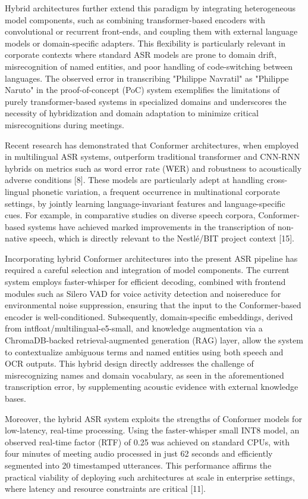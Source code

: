 \documentclass[12pt,a4paper]{article}
\begin{document}
Hybrid architectures further extend this paradigm by integrating heterogeneous model components, such as combining transformer-based encoders with convolutional or recurrent front-ends, and coupling them with external language models or domain-specific adapters. This flexibility is particularly relevant in corporate contexts where standard ASR models are prone to domain drift, misrecognition of named entities, and poor handling of code-switching between languages. The observed error in transcribing "Philippe Navratil" as "Philippe Naruto" in the proof-of-concept (PoC) system exemplifies the limitations of purely transformer-based systems in specialized domains and underscores the necessity of hybridization and domain adaptation to minimize critical misrecognitions during meetings.


Recent research has demonstrated that Conformer architectures, when employed in multilingual ASR systems, outperform traditional transformer and CNN-RNN hybrids on metrics such as word error rate (WER) and robustness to acoustically adverse conditions [8]. These models are particularly adept at handling cross-lingual phonetic variation, a frequent occurrence in multinational corporate settings, by jointly learning language-invariant features and language-specific cues. For example, in comparative studies on diverse speech corpora, Conformer-based systems have achieved marked improvements in the transcription of non-native speech, which is directly relevant to the Nestlé/BIT project context [15].


Incorporating hybrid Conformer architectures into the present ASR pipeline has required a careful selection and integration of model components. The current system employs faster-whisper for efficient decoding, combined with frontend modules such as Silero VAD for voice activity detection and noisereduce for environmental noise suppression, ensuring that the input to the Conformer-based encoder is well-conditioned. Subsequently, domain-specific embeddings, derived from intfloat/multilingual-e5-small, and knowledge augmentation via a ChromaDB-backed retrieval-augmented generation (RAG) layer, allow the system to contextualize ambiguous terms and named entities using both speech and OCR outputs. This hybrid design directly addresses the challenge of misrecognizing names and domain vocabulary, as seen in the aforementioned transcription error, by supplementing acoustic evidence with external knowledge bases.


Moreover, the hybrid ASR system exploits the strengths of Conformer models for low-latency, real-time processing. Using the faster-whisper small INT8 model, an observed real-time factor (RTF) of 0.25 was achieved on standard CPUs, with four minutes of meeting audio processed in just 62 seconds and efficiently segmented into 20 timestamped utterances. This performance affirms the practical viability of deploying such architectures at scale in enterprise settings, where latency and resource constraints are critical [11].
\end{document}
